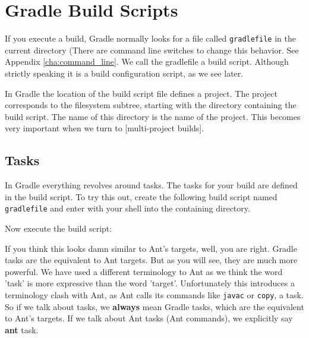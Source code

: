\chapter{Gradle Build Scripts}


If you execute a build, Gradle normally looks for a file called \texttt{gradlefile} in the current directory (There are command line switches to change this behavior. See Appendix \ref{cha:command_line}. We call the gradlefile a build script. Although strictly speaking it is a build configuration script, as we see later.

In Gradle the location of the build script file defines a project. The project corresponds to the filesystem subtree, starting with the directory containing the build script. The name of this directory is the name of the project. This becomes very important when we turn to [multi-project builds].

\section{Tasks}
In Gradle everything revolves around tasks. The tasks for your build are defined in the build script. To try this out, create the following build script named \texttt{gradlefile} and enter with your shell into the containing directory.

\noindent Now execute the build script:

If you think this looks damn similar to Ant's targets, well, you are right. Gradle tasks are the equivalent to Ant targets. But as you will see, they are much more powerful. We have used a different terminology to Ant as we think the word 'task' is more expressive than the word 'target'. Unfortunately this introduces a terminology clash with Ant, as Ant calls its commands like \texttt{javac} or \texttt{copy}, a task. So if we talk about tasks, we \textbf{always} mean Gradle tasks, which are the equivalent to Ant's targets. If we talk about Ant tasks (Ant commands), we explicitly say \textbf{ant} task.

